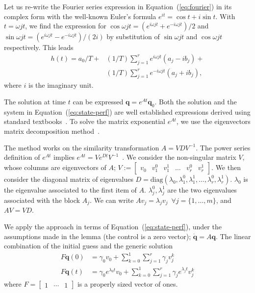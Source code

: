 \documentclass[letterpaper,10pt,journal,twoside]{IEEEtran}
\theoremstyle{definition}
\begin{document}
Let us re-write the Fourier series expression in Equation~(\ref{eq:fourier}) in its complex form with the well-known Euler's formula $e^{it}=\cos{t}+i\sin{t}$. With $t=\omega jt$, we find the expression for $\cos{\omega jt}=(e^{i\omega jt}+e^{-i\omega jt})/2$ and $\sin{\omega jt}=(e^{i\omega jt}-e^{-i\omega jt})/(2i)$ by substitution of $\sin{\omega jt}$ and $\cos{\omega jt}$ respectively. This leads~\cite{kuo1967automatic}
\begin{equation}\begin{split}\label{eq:proof-complex}
  h(t)=a_0/T+&(1/T)\sum_{j=1}^{r}{e^{i\omega jt}(a_j-ib_j)}+\\&(1/T)\sum_{j=1}^{r}{e^{-i\omega jt}(a_j+ib_j)},
 \end{split}\end{equation}
where $i$ is the imaginary unit. 

The solution at time $t$ can be expressed $\mathbf{q}=e^{At}\mathbf{q}_0$. Both the solution and the system in Equation~(\ref{eq:state-perf}) are well established expressions derived using standard textbooks~\cite{kuo1967automatic, ogata2002modern}. To solve the matrix exponential $e^{At}$, we use the eigenvectors matrix decomposition method~\cite{moler2003nineteen}.

The method works on the similarity transformation $A=VDV^{-1}$. The power series definition of $e^{At}$ implies $e^{At}=Ve^{Dt}V^{-1}$~\cite{moler2003nineteen}. We consider the non-singular matrix $V$, whose columns are eigenvectors of $A$; $V:=\begin{bmatrix}v_0 & v_1^0 & v_1^1 & \dots & v_r^0 & v_r^1\end{bmatrix}$. We then consider the diagonal matrix of eigenvalues $D=\mathrm{diag}{(\lambda_0,\lambda_1^0,\lambda_1^1,\dots,\lambda_r^0,\lambda_r^1)}$. $\lambda_0$ is the eigenvalue associated to the first item of $A$. $\lambda_j^0,\lambda_j^1$ are the two eigenvalues associated with the block $A_j$. We can write $Av_j=\lambda_jv_j\,\,\,\forall j=\{1,\dots,m\}$, and $AV=VD$. 

We apply the approach in terms of Equation~(\ref{eq:state-perf}), under the assumptions made in the lemma (the control is a zero vector); $\dot{\mathbf{q}}=A\mathbf{q}$. The linear combination of the initial guess and the generic solution
\begin{equation}\label{eq:proof-comb}\begin{split}
  F\mathbf{q}(0)&=\gamma_0 v_0+\sum_{k=0}^{1}{\sum_{j=1}^{r}{\gamma_j v_j^k}}\\
  F\mathbf{q}(t)&=\gamma_0 e^{\lambda_0 t} v_0+\sum_{k=0}^{1}{\sum_{j=1}^{r}{\gamma_j e^{\lambda_j t} v_j^k}}
\end{split}\end{equation}
where $F=\begin{bmatrix}1 & \cdots & 1\end{bmatrix}$ is a properly sized vector of ones. 
\end{document}
